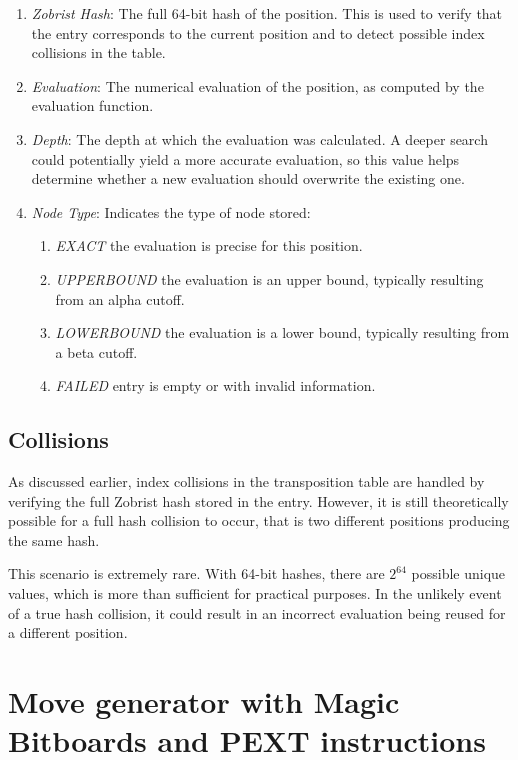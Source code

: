 \begin{enumerate}
  \item \textit{Zobrist Hash}: The full 64-bit hash of the position. This is used to verify that the entry corresponds to the current position and to detect possible index collisions in the table.
  \item \textit{Evaluation}: The numerical evaluation of the position, as computed by the evaluation function.
  \item \textit{Depth}: The depth at which the evaluation was calculated. A deeper search could potentially yield a more accurate evaluation, so this value helps determine whether a new evaluation should overwrite the existing one.
  \item \textit{Node Type}: Indicates the type of node stored:
  \begin{enumerate}
    \item \textit{EXACT} the evaluation is precise for this position.
    \item \textit{UPPERBOUND} the evaluation is an upper bound, typically resulting from an alpha cutoff.
    \item \textit{LOWERBOUND} the evaluation is a lower bound, typically resulting from a beta cutoff.
    \item \textit{FAILED} entry is empty or with invalid information.
  \end{enumerate}
\end{enumerate}

\subsection{Collisions}

As discussed earlier, index collisions in the transposition table are handled by verifying the full Zobrist hash stored in the entry. However, it is still theoretically possible for a full hash collision to occur, that is two different positions producing the same hash.

\vspace{1em}

\noindent This scenario is extremely rare. With 64-bit hashes, there are $2^{64}$ possible unique values, which is more than sufficient for practical purposes. In the unlikely event of a true hash collision, it could result in an incorrect evaluation being reused for a different position.

\section{Move generator with Magic Bitboards and PEXT instructions}

